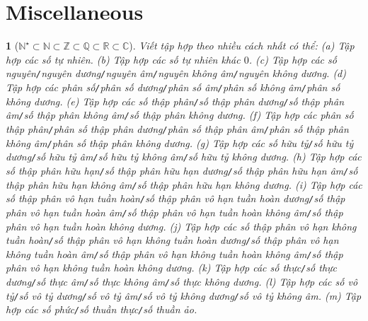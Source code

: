 \documentclass{article}
\newtheorem{baitoan}{}
\begin{document}
\section{Miscellaneous}

\begin{baitoan}[$\mathbb{N}^\star\subset\mathbb{N}\subset\mathbb{Z}\subset\mathbb{Q}\subset\mathbb{R}\subset\mathbb{C}$]
	Viết tập hợp theo nhiều cách nhất có thể: (a) Tập hợp các số tự nhiên. (b) Tập hợp các số tự nhiên khác $0$. (c) Tập hợp các số nguyên{\tt/}nguyên dương{\tt/}nguyên âm{\tt/}nguyên không âm{\tt/}nguyên không dương. (d) Tập hợp các phân số{\tt/}phân số dương{\tt/}phân số âm{\tt/}phân số không âm{\tt/}phân số không dương. (e) Tập hợp các số thập phân{\tt/}số thập phân dương{\tt/}số thập phân âm{\tt/}số thập phân không âm{\tt/}số thập phân không dương. (f) Tập hợp các phân số thập phân{\tt/}phân số thập phân dương{\tt/}phân số thập phân âm{\tt/}phân số thập phân không âm{\tt/}phân số thập phân không dương. (g) Tập hợp các số hữu tỷ{\tt/}số hữu tỷ dương{\tt/}số hữu tỷ âm{\tt/}số hữu tỷ không âm{\tt/}số hữu tỷ không dương. (h) Tập hợp các số thập phân hữu hạn{\tt/}số thập phân hữu hạn dương{\tt/}số thập phân hữu hạn âm{\tt/}số thập phân hữu hạn không âm{\tt/}số thập phân hữu hạn không dương. (i) Tập hợp các số thập phân vô hạn tuần hoàn{\tt/}số thập phân vô hạn tuần hoàn dương{\tt/}số thập phân vô hạn tuần hoàn âm{\tt/}số thập phân vô hạn tuần hoàn không âm{\tt/}số thập phân vô hạn tuần hoàn không dương. (j) Tập hợp các số thập phân vô hạn không tuần hoàn{\tt/}số thập phân vô hạn không tuần hoàn dương{\tt/}số thập phân vô hạn không tuần hoàn âm{\tt/}số thập phân vô hạn không tuần hoàn không âm{\tt/}số thập phân vô hạn không tuần hoàn không dương.  (k) Tập hợp các số thực{\tt/}số thực dương{\tt/}số thực âm{\tt/}số thực không âm{\tt/}số thực không dương. (l) Tập hợp các số vô tỷ{\tt/}số vô tỷ dương{\tt/}số vô tỷ âm{\tt/}số vô tỷ không dương{\tt/}số vô tỷ không âm. (m) Tập hợp các số phức{\tt/}số thuần thực{\tt/}số thuần ảo.
\end{baitoan}


\printbibliography[heading=bibintoc]
\end{document}
